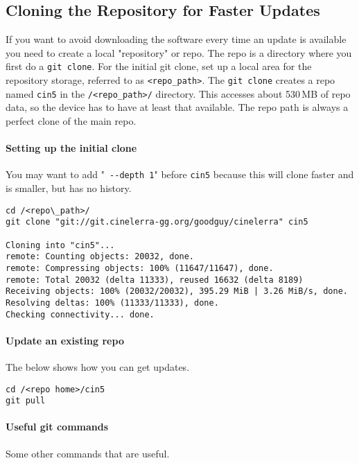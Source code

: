 \subsection{Cloning the Repository for Faster Updates}%
\label{sub:cloning_the_repository_for_faster_updates}

If you want to avoid downloading the software every time an update
is available you need to create a local "repository" or repo.  The
repo is a directory where you first do a \texttt{git clone}.  For
the initial git clone, set up a local area for the repository
storage, referred to as \texttt{<repo\_path>}.  The \texttt{git
  clone} creates a repo named \texttt{cin5} in the
\texttt{/<repo\_path>/} directory.  This accesses about 530\,MB of
repo data, so the device has to have at least that available.  The
repo path is always a perfect clone of the main repo.


\paragraph{Setting up the initial clone}%
\label{par:setting_up_the_initial_clone}

You may want to add "\texttt{ -{}-depth 1}" before \texttt{cin5}
because this will clone faster and is smaller, but has no history.

\begin{lstlisting}[style=sh]
cd /<repo\_path>/
git clone "git://git.cinelerra-gg.org/goodguy/cinelerra" cin5

Cloning into "cin5"...
remote: Counting objects: 20032, done.
remote: Compressing objects: 100% (11647/11647), done.
remote: Total 20032 (delta 11333), reused 16632 (delta 8189)
Receiving objects: 100% (20032/20032), 395.29 MiB | 3.26 MiB/s, done.
Resolving deltas: 100% (11333/11333), done.
Checking connectivity... done.
\end{lstlisting}


\paragraph{Update an existing repo}%
\label{par:update_an_existing_repo}
The below shows how you can get updates.

\begin{lstlisting}[style=sh]
cd /<repo home>/cin5
git pull
\end{lstlisting}


\paragraph{Useful git commands}%
\label{par:useful_git_commands}
Some other commands that are useful.

